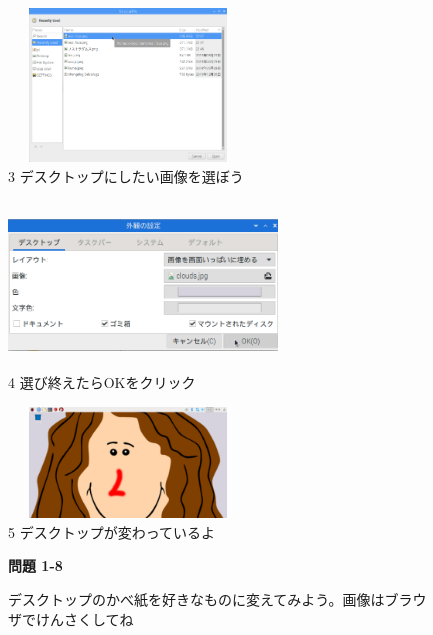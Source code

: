 \documentclass[a4paper,12pt]{jarticle}
\begin{document}
\begin{figure}
\begin{minipage}{\textwidth}
    \begin{minipage}{6.376cm}
      \includegraphics[width=6.347cm,height=4.084cm]{textbook-img110.png}\\
      3 デスクトップにしたい画像を選ぼう
    \end{minipage}
    \begin{minipage}{2.582cm}
    \end{minipage}
    \begin{minipage}{5.737cm}
      \includegraphics[width=7.145cm,height=4.451cm]{textbook-img109.png}\\
      4 選び終えたらOKをクリック
    \end{minipage}

  \end{minipage}

  \bigskip


  \flushleft
  \begin{minipage}{6.134cm}
    \includegraphics[width=6.347cm,height=2.945cm]{textbook-img111.png}\\
    5 デスクトップが変わっているよ
  \end{minipage}

  \bigskip

  {\bfseries
    問題 1-8}

  デスクトップのかべ紙を好きなものに変えてみよう。画像はブラウザでけんさくしてね
\end{figure}
\end{document}
